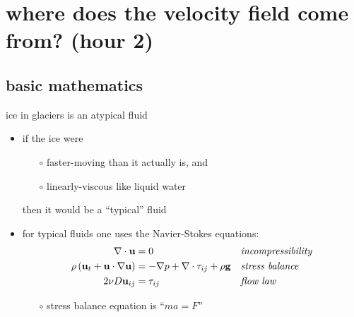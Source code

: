 \documentclass[10pt,dvipsnames]{beamer}
\begin{document}
\section[where does the velocity field come from?]{\textbf{where does the velocity field come from?} (hour 2)}

\subsection{basic mathematics}

\begin{frame}{ice in glaciers is an atypical fluid}

\begin{itemize}
\item if the ice were
  \begin{itemize}
  \item[$\circ$] faster-moving than it actually is, and
  \item[$\circ$] linearly-viscous like liquid water
  \end{itemize}

  then it would be a ``typical'' fluid

\bigskip
\item for typical fluids one uses the Navier-Stokes equations:
\begin{align*}
\nabla \cdot \mathbf{u} &= 0 &&\text{\emph{incompressibility}} \\
\rho \left(\mathbf{u}_t + \mathbf{u}\cdot\nabla \mathbf{u}\right) &= -\nabla p + \nabla \cdot \tau_{ij} + \rho \mathbf{g} &&\text{\emph{stress balance}} \\
2 \nu D\mathbf{u}_{ij} &= \tau_{ij} &&\text{\emph{flow law}}
\end{align*}

\medskip
    \begin{itemize}
    \item[$\circ$] stress balance equation is ``$m a = F$''
    \end{itemize}
\end{itemize}
\end{frame}
\end{document}
